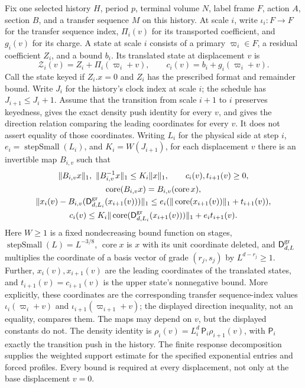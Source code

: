 Fix one selected history $H$, period $p$, terminal volume $N$, label frame
$F$, action $A$, section $B$, and a transfer sequence $M$ on this history. At scale $i$,
write $\iota_i:F\to F$ for the transfer sequence index, $\Pi_i(v)$ for its transported coefficient,
and $g_i(v)$ for its charge. A state at scale $i$ consists of a primary
$\varpi_i\in F$, a residual coefficient $Z_i$, and a bound $b_i$. Its translated
state at displacement $v$ is
\[
 \mathcal Z_i(v)=Z_i+\Pi_i(\varpi_i+v),\qquad
 c_i(v)=b_i+g_i(\varpi_i+v).
\]
Call the state keyed if $Z_i.x=0$ and $Z_i$ has the prescribed format and
remainder bound. Write $J_i$ for the history's clock index at scale $i$;
the schedule has $J_{i+1}\leq J_i+1$. Assume that the transition from
scale $i+1$ to $i$ preserves keyedness, gives the exact density push
identity for every $v$, and gives the direction relation comparing the
leading coordinates for every $v$. It does not assert equality of those
coordinates.
Writing $L_i$ for the physical side at step $i$,
$e_i=\operatorname{stepSmall}(L_i)$, and $K_i=W(J_{i+1})$, for each
displacement $v$ there is an invertible map $B_{i,v}$ such that
\[
\begin{gathered}
 \|B_{i,v} x\|_1,\ \|B_{i,v}^{-1}x\|_1\leq K_i\|x\|_1,
 \qquad c_i(v),t_{i+1}(v)\geq0,\\
 \operatorname{core}(B_{i,v}x)=B_{i,v}(\operatorname{core}x),\\
 \|x_i(v)-B_{i,v}(\mathsf D^{\rm gr}_{d,L_i}(x_{i+1}(v)))\|_1
   \leq e_i(\|\operatorname{core}(x_{i+1}(v))\|_1+t_{i+1}(v)),\\
 c_i(v)\leq K_i\|\operatorname{core}(\mathsf D^{\rm gr}_{d,L_i}(x_{i+1}(v)))\|_1
       +e_i t_{i+1}(v).
\end{gathered}
\]
Here $W\geq1$ is a fixed nondecreasing bound function on stages,
$\operatorname{stepSmall}(L)=L^{-3/8}$, $\operatorname{core}x$ is $x$ with
its unit coordinate deleted, and $\mathsf D^{\rm gr}_{d,L}$ multiplies the
coordinate of a basis vector of grade $(r_j,s_j)$ by $L^{d-r_j}\geq1$.
Further, $x_i(v),x_{i+1}(v)$ are the leading coordinates of the translated
states, and $t_{i+1}(v)=c_{i+1}(v)$ is the upper state's nonnegative bound. More
explicitly, these coordinates are the corresponding transfer sequence-index values
$\iota_i(\varpi_i+v)$ and $\iota_{i+1}(\varpi_{i+1}+v)$; the displayed
direction inequality,
not an equality, compares them. The maps may depend on $v$, but the
displayed constants do not. The density identity is
$\rho_i(v)=L_i^d\,\mathsf P_i\rho_{i+1}(v)$, with $\mathsf P_i$ exactly
the transition push in the history. The finite response decomposition supplies the
weighted support estimate for the specified exponential entries and forced
profiles. Every bound is required at every displacement, not only at the
base displacement $v=0$.

